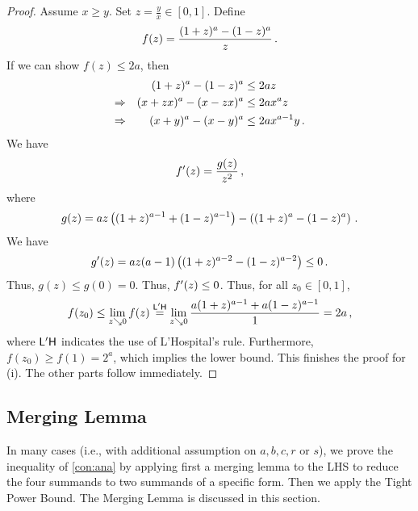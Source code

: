 \begin{proof}
	Assume $x\geq y$.
	Set $z = \frac yx \in[0,1]$. Define
	\begin{equation*}
		f(z) = \frac{(1+z)^a-(1-z)^a}{z}
		\, .
	\end{equation*}
	If we can show $f(z) \leq 2a$, then
	\begin{align*}
		&&(1+z)^a-(1-z)^a &\leq 2a z\\
		\Rightarrow && (x+zx)^a-(x-zx)^a &\leq 2a x^a z\\
		\Rightarrow && (x+y)^a-(x-y)^a &\leq 2a x^{a-1} y
		\, .
	\end{align*}
	We have 
	\begin{equation*}
		f^\prime(z) = \frac {g(z)}{z^2}
		\, ,
	\end{equation*}
	where
	\begin{equation*}
		g(z) = az \left( (1+z)^{a-1}+(1-z)^{a-1} \right)-\left( (1+z)^{a}-(1-z)^{a} \right)
		\, .
	\end{equation*}
	We have
	\begin{equation*}
		g^\prime(z) = az(a-1)\left( (1+z)^{a-2}-(1-z)^{a-2} \right) \leq 0\, .
	\end{equation*}
	Thus, $g(z)\leq g(0) = 0$.
	Thus, $f^\prime(z)\leq0$.
	Thus, for all $z_0 \in [0,1]$,
	\begin{equation*}
		f(z_0) 
		\leq 
		\lim_{z\searrow 0}f(z) 
		\stackrel{\mathsf{L'H}}{=} 
		\lim_{z\searrow 0}\frac{a(1+z)^{a-1}+a(1-z)^{a-1}}{1} 
		= 
		2a
		\, ,
	\end{equation*}
	where $\mathsf{L'H}$ indicates the use of L'Hospital's rule. 
	Furthermore, $f(z_0) \geq f(1) = 2^a$, which implies the lower bound. 
	This finishes the proof for (i). The other parts follow immediately.
\end{proof}
%
%
%
\subsection{Merging Lemma}\label{ssec:merginglemma}
%
In many cases (i.e., with additional assumption on $a,b,c,r$ or $s$), we prove the inequality of \autoref{con:ana} by applying first a merging lemma to the LHS to reduce the four summands to two summands of a specific form. Then we apply the Tight Power Bound. The Merging Lemma is discussed in this section.
%
